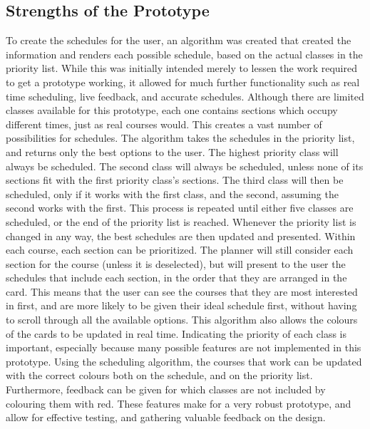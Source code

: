 \documentclass{article}
\begin{document}
\subsection{Strengths of the Prototype}
To create the schedules for the user, an algorithm was created that created the information and renders each possible schedule, based on the actual classes in the priority list. While this was initially intended merely to lessen the work required to get a prototype working, it allowed for much further functionality such as real time scheduling, live feedback, and accurate schedules.
\newline
\newline
Although there are limited classes available for this prototype, each one contains sections which occupy different times, just as real courses would. This creates a vast number of possibilities for schedules. The algorithm  takes the schedules in the priority list, and returns only the best options to the user. The highest priority class will always be scheduled. The second class will always be scheduled, unless none of its sections fit with the first priority class's sections. The third class will then be scheduled, only if it works with the first class, and the second, assuming the second works with the first. This process is repeated until either five classes are scheduled, or the end of the priority list is reached. Whenever the priority list is changed in any way, the best schedules are then updated and presented. 
\newline
\newline
Within each course, each section can be prioritized. The planner will still consider each section for the course (unless it is deselected), but will present to the user the schedules that include each section, in the order that they are arranged in the card. This means that the user can see the courses that they are most interested in first, and are more likely to be given their ideal schedule first, without having to scroll through all the available options. 
\newline
\newline
This algorithm also allows the colours of the cards to be updated in real time. Indicating the priority of each class is important, especially because many possible features are not implemented in this prototype. Using the scheduling algorithm, the courses that work can be updated with the correct colours both on the schedule, and on the priority list. Furthermore, feedback can be given for which classes are not included by colouring them with red. These features make for a very robust prototype, and allow for effective testing, and gathering valuable feedback on the design.
\end{document}
